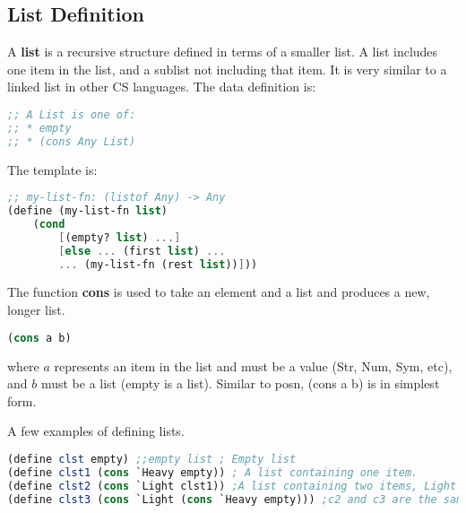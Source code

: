 \documentclass[english, 12pt]{article}
\begin{document}
\subsection{List Definition}
\begin{defn}
A \textbf{list} is a recursive structure defined in terms of a smaller list. A list includes one item in the list, and a sublist not including that item. It is very similar to a linked list in other CS languages. The data definition is:
\begin{lstlisting}[language=Scheme]
;; A List is one of:
;; * empty
;; * (cons Any List)
\end{lstlisting}
The template is:
\begin{lstlisting}[language=Scheme]
;; my-list-fn: (listof Any) -> Any
(define (my-list-fn list)
	(cond
		[(empty? list) ...]
		[else ... (first list) ...
		... (my-list-fn (rest list))]))
\end{lstlisting}
\end{defn}
\begin{defn}
The function \textbf{cons} is used to take an element and a list and produces a new, longer list.
\begin{lstlisting}[language=Scheme]
(cons a b)
\end{lstlisting}
where $a$ represents an item in the list and must be a value (Str, Num, Sym, etc), and $b$ must be a list (empty is a list). Similar to posn, (cons a b) is in simplest form.
\end{defn}
\begin{exmp}
A few examples of defining lists.
\begin{lstlisting}[language=Scheme]
(define clst empty) ;;empty list ; Empty list
(define clst1 (cons `Heavy empty)) ; A list containing one item.
(define clst2 (cons `Light clst1)) ;A list containing two items, Light and Heavy
(define clst3 (cons `Light (cons `Heavy empty))) ;c2 and c3 are the same
\end{lstlisting}
\end{exmp}
\end{document}
